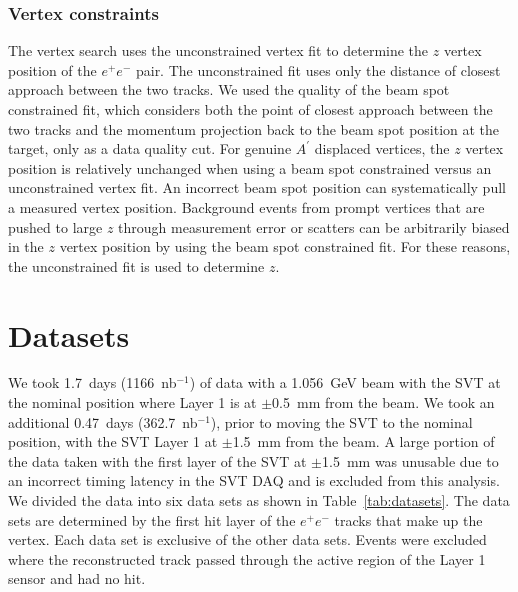 \subsubsection{Vertex constraints}

The vertex search uses the unconstrained vertex fit to determine the $z$ vertex position of the $e^+e^-$ pair. The unconstrained fit uses only the distance of closest approach between the two tracks. We used the quality of the beam spot constrained fit, which considers both the point of closest approach between the two tracks and the momentum projection back to the beam spot position at the target, only as a data quality cut. For genuine $A^{\prime}$ displaced vertices, the $z$ vertex position is relatively unchanged when using a beam spot constrained versus an unconstrained vertex fit. An incorrect beam spot position can systematically pull a measured vertex position. Background events from prompt vertices that are pushed to large $z$ through measurement error or scatters can be arbitrarily biased in the $z$ vertex position by using the beam spot constrained fit. For these reasons, the unconstrained fit is used to determine $z$.\\

\section{Datasets}
We took 1.7~days (1166~nb$^{-1}$) of data with a 1.056~GeV beam with the SVT at the nominal position where Layer 1 is at $\pm$0.5~mm from the beam. We took an additional 0.47~days (362.7~nb$^{-1}$), prior to moving the SVT to the nominal position, with the SVT Layer 1 at $\pm$1.5~mm from the beam. A large portion of the data taken with the first layer of the SVT at $\pm$1.5~mm was unusable due to an incorrect timing latency in the SVT DAQ and is excluded from this analysis. We divided the data into six data sets as shown in Table~\ref{tab:datasets}. The data sets are determined by the first hit layer of the $e^+e^-$ tracks that make up the vertex. Each data set is exclusive of the other data sets. Events were excluded where the reconstructed track passed through the active region of the Layer 1 sensor and had no hit. 

